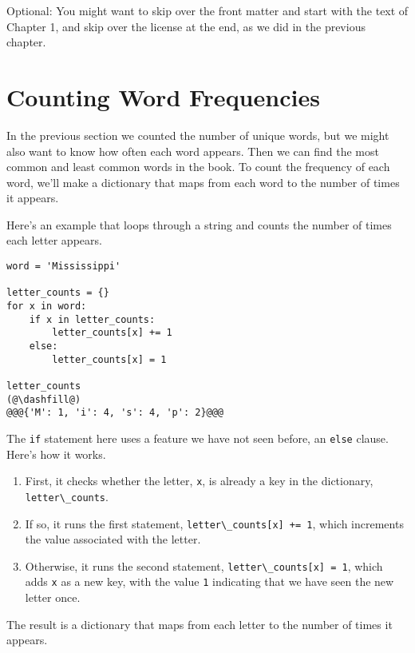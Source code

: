 Optional: You might want to skip over the front matter and start with
the text of Chapter 1, and skip over the license at the end, as we did
in the previous chapter.

\hypertarget{counting-word-frequencies}{%
\section{Counting Word Frequencies}\label{counting-word-frequencies}}

In the previous section we counted the number of unique words, but we
might also want to know how often each word appears. Then we can find
the most common and least common words in the book. To count the
frequency of each word, we'll make a dictionary that maps from each word
to the number of times it appears.

Here's an example that loops through a string and counts the number of
times each letter appears.

\begin{lstlisting}[]
word = 'Mississippi'

letter_counts = {}
for x in word:
    if x in letter_counts:
        letter_counts[x] += 1
    else:
        letter_counts[x] = 1
        
letter_counts
(@\dashfill@)
@@@{'M': 1, 'i': 4, 's': 4, 'p': 2}@@@
\end{lstlisting}

The \passthrough{\lstinline!if!} statement here uses a feature we have
not seen before, an \passthrough{\lstinline!else!} clause. Here's how it
works.

\begin{enumerate}
\def\labelenumi{\arabic{enumi}.}
\item
  First, it checks whether the letter, \passthrough{\lstinline!x!}, is
  already a key in the dictionary,
  \passthrough{\lstinline!letter\_counts!}.
\item
  If so, it runs the first statement,
  \passthrough{\lstinline!letter\_counts[x] += 1!}, which increments the
  value associated with the letter.
\item
  Otherwise, it runs the second statement,
  \passthrough{\lstinline!letter\_counts[x] = 1!}, which adds
  \passthrough{\lstinline!x!} as a new key, with the value
  \passthrough{\lstinline!1!} indicating that we have seen the new
  letter once.
\end{enumerate}

The result is a dictionary that maps from each letter to the number of
times it appears.


